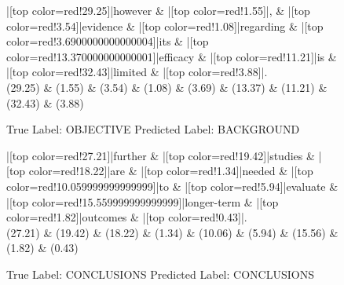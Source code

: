\documentclass[a4paper, landscape]{article}
\begin{document}
\begin{figure}
\begin{center}
\begin{dependency}
\begin{deptext}
|[top color=red!29.25]|however \& |[top color=red!1.55]|, \& |[top color=red!3.54]|evidence \& |[top color=red!1.08]|regarding \& |[top color=red!3.6900000000000004]|its \& |[top color=red!13.370000000000001]|efficacy \& |[top color=red!11.21]|is \& |[top color=red!32.43]|limited \& |[top color=red!3.88]|.\\
(29.25) \& (1.55) \& (3.54) \& (1.08) \& (3.69) \& (13.37) \& (11.21) \& (32.43) \& (3.88)\\
\end{deptext}
\end{dependency}
\end{center}
\caption{True Label: OBJECTIVE Predicted Label: BACKGROUND}
\end{figure}
\clearpage
\begin{figure}
\begin{center}
\begin{dependency}
\begin{deptext}
|[top color=red!27.21]|further \& |[top color=red!19.42]|studies \& |[top color=red!18.22]|are \& |[top color=red!1.34]|needed \& |[top color=red!10.059999999999999]|to \& |[top color=red!5.94]|evaluate \& |[top color=red!15.559999999999999]|longer-term \& |[top color=red!1.82]|outcomes \& |[top color=red!0.43]|.\\
(27.21) \& (19.42) \& (18.22) \& (1.34) \& (10.06) \& (5.94) \& (15.56) \& (1.82) \& (0.43)\\
\end{deptext}
\end{dependency}
\end{center}
\caption{True Label: CONCLUSIONS Predicted Label: CONCLUSIONS}
\end{figure}
\clearpage
\end{document}
